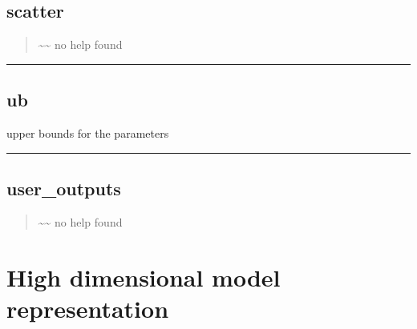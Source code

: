 \documentclass[letterpaper,10pt,english]{sphinxmanual}
\begin{document}
\section{scatter}
\label{classes/utils/@mcf/mcf:scatter}\label{classes/utils/@mcf/mcf:id33}\begin{quote}

\textasciitilde{}\textasciitilde{} no help found
\end{quote}


\bigskip\hrule{}\bigskip



\section{ub}
\label{classes/utils/@mcf/mcf:id34}\label{classes/utils/@mcf/mcf:ub}
upper bounds for the parameters


\bigskip\hrule{}\bigskip



\section{user\_outputs}
\label{classes/utils/@mcf/mcf:id35}\label{classes/utils/@mcf/mcf:user-outputs}\begin{quote}

\textasciitilde{}\textasciitilde{} no help found
\end{quote}


\chapter{High dimensional model representation}
\label{classes/utils/@hdmr/hdmr::doc}\label{classes/utils/@hdmr/hdmr:high-dimensional-model-representation}
\end{document}
